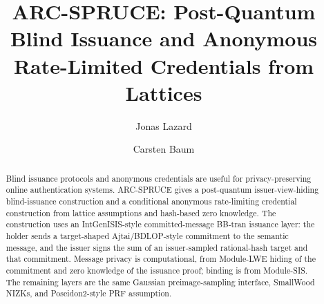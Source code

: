 \documentclass[sigconf]{acmart}
\title{ARC-SPRUCE: Post-Quantum Blind Issuance and Anonymous Rate-Limited Credentials from Lattices}
\author{Jonas Lazard}
\affiliation{%
  \institution{DTU Compute}
  \city{Kongens Lyngby}
  \country{Denmark}
}
\author{Carsten Baum}
\affiliation{%
  \institution{DTU Compute}
  \city{Kongens Lyngby}
  \country{Denmark}
}
\begin{document}
\begin{abstract}
Blind issuance protocols and anonymous credentials are useful for privacy-preserving online authentication
systems.  ARC-SPRUCE gives a post-quantum issuer-view-hiding blind-issuance construction and a conditional
anonymous rate-limiting credential construction from lattice assumptions and hash-based zero knowledge.  The
construction uses an IntGenISIS-style committed-message BB-tran issuance layer: the holder sends a
target-shaped Ajtai/BDLOP-style commitment to the semantic message, and the issuer signs the sum of an
issuer-sampled rational-hash target and that commitment.  Message privacy is computational, from Module-LWE
hiding of the commitment and zero knowledge of the issuance proof; binding is from Module-SIS.  The remaining
layers are the same Gaussian preimage-sampling interface, SmallWood NIZKs, and Poseidon2-style PRF assumption.
\end{abstract}

\maketitle








\appendix








\end{document}
